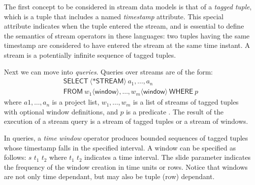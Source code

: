 The first concept to be considered in stream data models is that of a \textit{tagged tuple}, which is a tuple that
includes a named \textit{timestamp} attribute. This special attribute indicates when the tuple entered the stream, and
is essential to define the semantics of stream operators in these languages: two tuples having the same timestamp are
considered to have entered the stream at the same time instant. A stream is a potentially infinite sequence of tagged
tuples.

Next we can move into \emph{queries}. Queries over streams are of the form:
\begin{align*}
&\mathsf{SELECT}\ \langle\mathsf{*STREAM}\rangle\ a_1,\ldots ,a_n\  \\ &\mathsf{FROM}\ w_1 \langle \mathsf{window} \rangle,\ldots,w_m \langle \mathsf{window} \rangle\ \mathsf{WHERE}\ p 
\end{align*}
where $a1, \ldots ,a_n$ is a project list, $w_1, \ldots , w_m$ is a list of streams of tagged tuples with optional
window definitions, and $p$ is a predicate \cite{Arasu_2006,Brenninkmeijer_08}. The result of the execution of a stream
query is a stream of tagged tuples or a stream of windows.

In queries, a \emph{time window} operator produces bounded sequences of tagged tuples whose timestamp falls in the
specified interval. A window can be specified as follows: $s$ \serifa{[FROM} $t_1$  $t_2$ \serifa{SLIDE int
unit]} where  $t_1$  $t_2$ indicates a time interval. The slide parameter indicates the
frequency of the window creation in time units or rows.
Notice that windows are not only time dependant, but may also be tuple (row) dependant.

